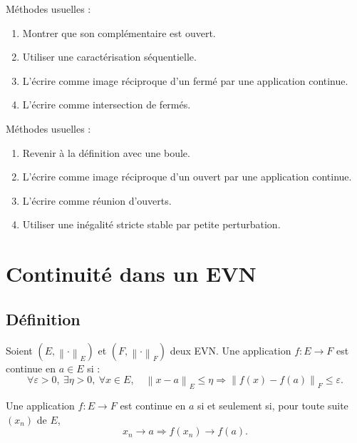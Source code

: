 \documentclass[11pt,a4paper]{article}
\newcommand{\norme}[1]{\left\lVert #1 \right\rVert}
\begin{document}
\begin{methodbox}
Méthodes usuelles :
\begin{enumerate}
    \item Montrer que son complémentaire est ouvert.
    \item Utiliser une caractérisation séquentielle.
    \item L'écrire comme image réciproque d'un fermé par une application continue.
    \item L'écrire comme intersection de fermés.
\end{enumerate}
\end{methodbox}

\begin{methodbox}
Méthodes usuelles :
\begin{enumerate}
    \item Revenir à la définition avec une boule.
    \item L'écrire comme image réciproque d'un ouvert par une application continue.
    \item L'écrire comme réunion d'ouverts.
    \item Utiliser une inégalité stricte stable par petite perturbation.
\end{enumerate}
\end{methodbox}

\section{Continuité dans un EVN}

\subsection{Définition}

\begin{definitionbox}
Soient \((E,\norme{\cdot}_E)\) et \((F,\norme{\cdot}_F)\) deux EVN.  
Une application \(f:E\to F\) est continue en \(a\in E\) si :
\[
\forall \varepsilon>0,\ \exists \eta>0,\ \forall x\in E,\quad
\norme{x-a}_E\leq\eta\Rightarrow \norme{f(x)-f(a)}_F\leq\varepsilon.
\]
\end{definitionbox}

\begin{theorembox}
Une application \(f:E\to F\) est continue en \(a\) si et seulement si, pour toute suite \((x_n)\) de \(E\),
\[
x_n\to a \Rightarrow f(x_n)\to f(a).
\]
\end{theorembox}
\end{document}
